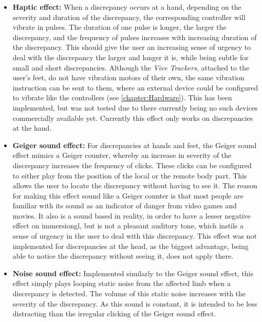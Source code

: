 \begin{itemize}
    
    \item \textbf{Haptic effect:}
    \newline
    When a discrepancy occurs at a hand, depending on the severity and duration of the discrepancy, the corresponding controller will vibrate in pulses. The duration of one pulse is longer, the larger the discrepancy, and the frequency of pulses increases with increasing duration of the discrepancy. This should give the user an increasing sense of urgency to deal with the discrepancy the larger and longer it is, while being subtle for small and short discrepancies.
    \newline
    Although the \textit{Vive Trackers}, attached to the user's feet, do not have vibration motors of their own, the same vibration instruction can be sent to them, where an external device could be configured to vibrate like the controllers (see \autoref{chapter:Hardware}). This has been implemented, but was not tested due to there currently being no such devices commercially available yet.
    \newline
    Currently this effect only works on discrepancies at the hand.
    
    
    \item \textbf{Geiger sound effect:}
    \newline
    For discrepancies at hands and feet, the Geiger sound effect mimics a Geiger counter, whereby an increase in severity of the discrepancy increases the frequency of clicks. These clicks can be configured to either play from the position of the local or the remote body part. This allows the user to locate the discrepancy without having to see it. The reason for making this effect sound like a Geiger counter is that most people are familiar with its sound as an indicator of danger from video games and movies. It also is a sound based in reality, in order to have a lesser negative effect on \gls{immersiongl}, but is not a pleasant auditory tone, which instils a sense of urgency in the user to deal with this discrepancy.
    \newline
    This effect was not implemented for discrepancies at the head, as the biggest advantage, being able to notice the discrepancy without seeing it, does not apply there.
    
    
    \item \textbf{Noise sound effect:}
    \newline
    Implemented similarly to the Geiger sound effect, this effect simply plays looping static noise from the affected limb when a discrepancy is detected. The volume of this static noise increases with the severity of the discrepancy. As this sound is constant, it is intended to be less distracting than the irregular clicking of the Geiger sound effect.
    

\end{itemize}
